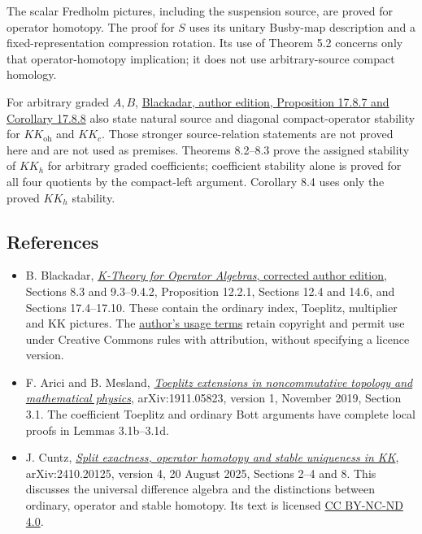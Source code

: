 \documentclass[
  11pt,
]{article}
\providecommand{\tightlist}{%
  \setlength{\itemsep}{0pt}\setlength{\parskip}{0pt}}
\begin{document}
The scalar Fredholm pictures, including the suspension source, are
proved for operator homotopy. The proof for \(S\) uses its unitary
Busby-map description and a fixed-representation compression rotation.
Its use of Theorem 5.2 concerns only that operator-homotopy implication;
it does not use arbitrary-source compact homology.

For arbitrary graded \(A,B\),
\href{https://www.bruceblackadar.com/Mathematics/book6.pdf}{Blackadar,
author edition, Proposition 17.8.7 and Corollary 17.8.8} also state
natural source and diagonal compact-operator stability for
\(KK_{\mathrm{oh}}\) and \(KK_c\). Those stronger source-relation
statements are not proved here and are not used as premises. Theorems
8.2--8.3 prove the assigned stability of \(KK_h\) for arbitrary graded
coefficients; coefficient stability alone is proved for all four
quotients by the compact-left argument. Corollary 8.4 uses only the
proved \(KK_h\) stability.

\subsection{References}\label{references}

\begin{itemize}
\tightlist
\item
  B. Blackadar,
  \href{https://www.bruceblackadar.com/Mathematics/book6.pdf}{\emph{K-Theory
  for Operator Algebras}, corrected author edition}, Sections 8.3 and
  9.3--9.4.2, Proposition 12.2.1, Sections 12.4 and 14.6, and Sections
  17.4--17.10. These contain the ordinary index, Toeplitz, multiplier
  and KK pictures. The
  \href{https://www.bruceblackadar.com/mathpubs.html}{author's usage
  terms} retain copyright and permit use under Creative Commons rules
  with attribution, without specifying a licence version.
\item
  F. Arici and B. Mesland,
  \href{https://arxiv.org/pdf/1911.05823v1}{\emph{Toeplitz extensions in
  noncommutative topology and mathematical physics}}, arXiv:1911.05823,
  version 1, November 2019, Section 3.1. The coefficient Toeplitz and
  ordinary Bott arguments have complete local proofs in Lemmas
  3.1b--3.1d.
\item
  J. Cuntz, \href{https://arxiv.org/pdf/2410.20125v4}{\emph{Split
  exactness, operator homotopy and stable uniqueness in KK}},
  arXiv:2410.20125, version 4, 20 August 2025, Sections 2--4 and 8. This
  discusses the universal difference algebra and the distinctions
  between ordinary, operator and stable homotopy. Its text is licensed
  \href{https://creativecommons.org/licenses/by-nc-nd/4.0/}{CC BY-NC-ND
  4.0}.
\end{itemize}
\end{document}

